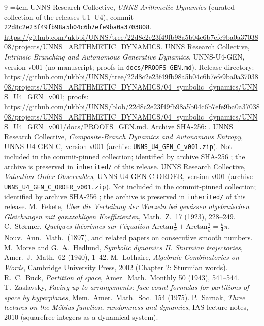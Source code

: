 \begin{thebibliography}{9}\small
\emergencystretch=4em
 UNNS Research Collective, \emph{UNNS Arithmetic Dynamics} (curated collection of the releases U1--U4), commit \texttt{22d8c2e23f49fb98a5b04c6b7efe9ba0a3703808}. \url{https://github.com/ukbbi/UNNS/tree/22d8c2e23f49fb98a5b04c6b7efe9ba0a3703808/projects/UNNS_ARITHMETIC_DYNAMICS}.
 UNNS Research Collective, \emph{Intrinsic Branching and Autonomous Generative Dynamics}, UNNS-U4-GEN, version v001 (no manuscript; proofs in \texttt{docs/PROOFS\_GEN.md}). Release directory: \url{https://github.com/ukbbi/UNNS/tree/22d8c2e23f49fb98a5b04c6b7efe9ba0a3703808/projects/UNNS_ARITHMETIC_DYNAMICS/04_symbolic_dynamics/UNNS_U4_GEN_v001}; proofs: \url{https://github.com/ukbbi/UNNS/blob/22d8c2e23f49fb98a5b04c6b7efe9ba0a3703808/projects/UNNS_ARITHMETIC_DYNAMICS/04_symbolic_dynamics/UNNS_U4_GEN_v001/docs/PROOFS_GEN.md}. Archive SHA-256: .
 UNNS Research Collective, \emph{Composite-Branch Dynamics and Autonomous Entropy}, UNNS-U4-GEN-C, version v001 (archive \texttt{UNNS\_U4\_GEN\_C\_v001.zip}). Not included in the commit-pinned collection; identified by archive SHA-256 ; the archive is preserved in \texttt{inherited/} of this release.
 UNNS Research Collective, \emph{Valuation-Order Observables}, UNNS-U4-GEN-C-ORDER, version v001 (archive \texttt{UNNS\_U4\_GEN\_C\_ORDER\_v001.zip}). Not included in the commit-pinned collection; identified by archive SHA-256 ; the archive is preserved in \texttt{inherited/} of this release.
 M.\ Fekete, \emph{\"Uber die Verteilung der Wurzeln bei gewissen algebraischen Gleichungen mit ganzzahligen Koeffizienten}, Math.\ Z.\ 17 (1923), 228--249.
 C.\ Størmer, \emph{Quelques théorèmes sur l'équation $\mathrm{Arctan}\frac1x+\mathrm{Arctan}\frac1y=\frac k4\pi$}, Nouv.\ Ann.\ Math.\ (1897), and related papers on consecutive smooth numbers.
 M.\ Morse and G.\ A.\ Hedlund, \emph{Symbolic dynamics II. Sturmian trajectories}, Amer.\ J.\ Math.\ 62 (1940), 1--42.
 M.\ Lothaire, \emph{Algebraic Combinatorics on Words}, Cambridge University Press, 2002 (Chapter 2: Sturmian words).
 R.\ C.\ Buck, \emph{Partition of space}, Amer.\ Math.\ Monthly 50 (1943), 541--544.
 T.\ Zaslavsky, \emph{Facing up to arrangements: face-count formulas for partitions of space by hyperplanes}, Mem.\ Amer.\ Math.\ Soc.\ 154 (1975).
 P.\ Sarnak, \emph{Three lectures on the Möbius function, randomness and dynamics}, IAS lecture notes, 2010 (squarefree integers as a dynamical system).
\end{thebibliography}
